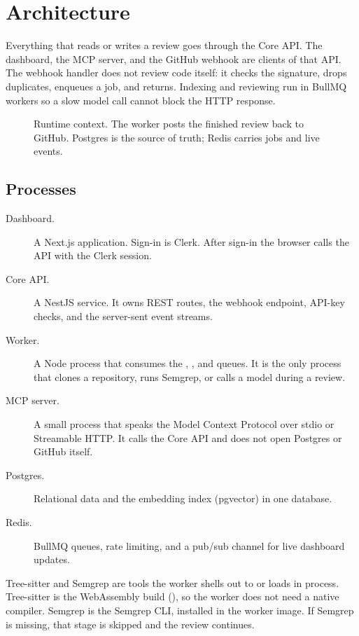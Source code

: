 \chapter{Architecture}
\label{chap:architecture}

Everything that reads or writes a review goes through the Core API. The dashboard, the MCP server, and the GitHub webhook are clients of that API. The webhook handler does not review code itself: it checks the signature, drops duplicates, enqueues a job, and returns. Indexing and reviewing run in BullMQ workers so a slow model call cannot block the HTTP response.

\begin{figure}[H]
  \centering
  \resizebox{\linewidth}{!}{}
  \caption{Runtime context. The worker posts the finished review back to GitHub. Postgres is the source of truth; Redis carries jobs and live events.}
  \label{fig:architecture}
\end{figure}

\section{Processes}

\begin{description}
  \item[Dashboard.] A Next.js application. Sign-in is Clerk. After sign-in the browser calls the API with the Clerk session.
  \item[Core API.] A NestJS service. It owns REST routes, the webhook endpoint, API-key checks, and the server-sent event streams.
  \item[Worker.] A Node process that consumes the , , and  queues. It is the only process that clones a repository, runs Semgrep, or calls a model during a review.
  \item[MCP server.] A small process that speaks the Model Context Protocol over stdio or Streamable HTTP. It calls the Core API and does not open Postgres or GitHub itself.
  \item[Postgres.] Relational data and the embedding index (pgvector) in one database.
  \item[Redis.] BullMQ queues, rate limiting, and a pub/sub channel for live dashboard updates.
\end{description}

Tree-sitter and Semgrep are tools the worker shells out to or loads in process. Tree-sitter is the WebAssembly build (), so the worker does not need a native compiler. Semgrep is the Semgrep CLI, installed in the worker image. If Semgrep is missing, that stage is skipped and the review continues.

